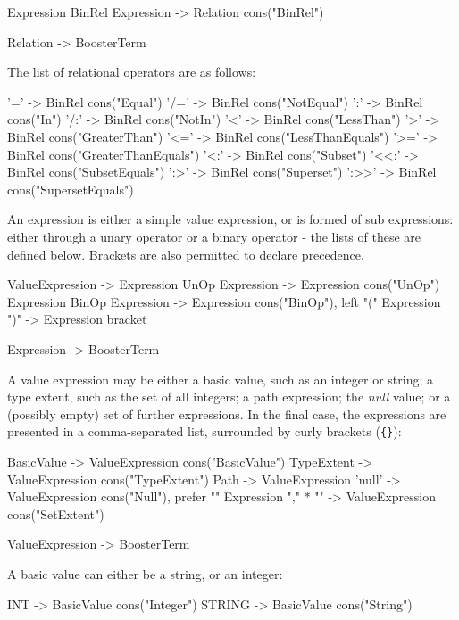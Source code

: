 \begin{code}
Expression BinRel Expression -> Relation {cons("BinRel")}

Relation -> BoosterTerm
\end{code}  

The list of relational operators are as follows:	 

\begin{code}
'=' 	-> BinRel {cons("Equal")}
'/=' 	-> BinRel {cons("NotEqual")}
':' 	-> BinRel {cons("In")}
'/:' 	-> BinRel {cons("NotIn")}
'<' 	-> BinRel {cons("LessThan")}
'>' 	-> BinRel {cons("GreaterThan")}
'<=' 	-> BinRel {cons("LessThanEquals")}
'>=' 	-> BinRel {cons("GreaterThanEquals")}
'<:' 	-> BinRel {cons("Subset")}
'<<:' 	-> BinRel {cons("SubsetEquals")}
':>' 	-> BinRel {cons("Superset")}
':>>' 	-> BinRel {cons("SupersetEquals")}
\end{code}
    
An expression is either a simple value expression, or is formed of sub
expressions: either through a unary operator or a binary operator -
the lists of these are defined below.  Brackets are also permitted to
declare precedence.

\begin{code}    
ValueExpression 	    -> Expression
UnOp Expression	            -> Expression {cons("UnOp")}
Expression BinOp Expression -> Expression {cons("BinOp"), left}
"(" Expression ")" 	    -> Expression {bracket}

Expression -> BoosterTerm
\end{code}

A value expression may be either a basic value, such as an integer or
string; a type extent, such as the set of all integers; a path
expression; the \emph{null} value; or a (possibly empty) set of
further expressions.  In the final case, the expressions are presented
in a comma-separated list, surrounded by curly brackets (\verb|{}|):

\begin{code}
BasicValue                 -> ValueExpression {cons("BasicValue")}
TypeExtent                 -> ValueExpression {cons("TypeExtent")}
Path		           -> ValueExpression {} 
'null'		           -> ValueExpression {cons("Null"), prefer}
"{" {Expression "," }* "}" -> ValueExpression {cons("SetExtent")}

ValueExpression -> BoosterTerm
\end{code}

A basic value can either be a string, or an integer:
\begin{code}
INT 		-> BasicValue {cons("Integer")}
STRING		-> BasicValue {cons("String")}
\end{code}


